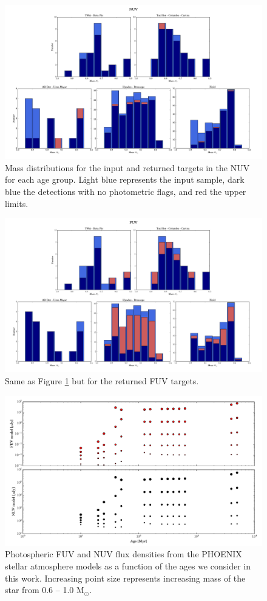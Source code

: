 \documentclass[twocolumn]{aastex62}
\begin{document}
\begin{figure}[h]
\centering
\includegraphics[width=.9\linewidth]{massdistributions_nuv.pdf}
\caption{Mass distributions for the input and returned targets in the NUV for each age group. Light blue represents the input sample, dark blue the detections with no photometric flags, and red the upper limits.  \label{fig:massdistributions_nuv}}
\end{figure}


\begin{figure}[h]
\centering
\includegraphics[width=.9\linewidth]{massdistributions_fuv.pdf}
\caption{Same as Figure \ref{fig:massdistributions_nuv} but for the returned FUV targets. \label{fig:massdistributions_fuv}}
\end{figure}

\begin{figure}[th]
\centering
\includegraphics[width=0.8\linewidth]{mfd_vs_age.pdf}
\caption{Photospheric FUV and NUV flux densities from the PHOENIX stellar atmosphere models as a function of the ages we consider in this work. Increasing point size represents increasing mass of the star from 0.6 -- 1.0 M$_{\odot}$.  \label{fig:mvd_vs_age}}
\end{figure}
\end{document}
